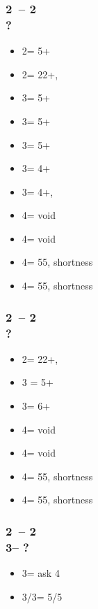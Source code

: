 \subsubsection*{2\clubs\ -- 2\hearts\\?}
\begin{itemize}
    \item 2\spades = 5+\spades
    \item 2\nt = 22+, \bal
    \item 3\clubs = 5+\clubs
    \item 3\diams = 5+\diams
    \item 3\hearts = 5+\hearts
    \item 3\spades = 4+\diams
    \item 3\nt = 4+\diams, \fonce
    \item 4\clubs = \hearts void
    \item 4\diams = \spades void
    \item 4\hearts = 55\minor, \hearts shortness
    \item 4\spades = 55\minor, \spades shortness
\end{itemize}

\subsubsection*{2\clubs\ -- 2\spades\\?}
\begin{itemize}
    \item 2\nt = 22+, \bal
    \item 3 = 5+
    \item 3\nt = 6+\major
    \item 4\clubs = \hearts void
    \item 4\diams = \spades void
    \item 4\hearts = 55\minor, \hearts shortness
    \item 4\spades = 55\minor, \spades shortness
\end{itemize}

\subsubsection*{2\clubs\ -- 2\\
                3\clubs -- ?}
\begin{itemize}
    \item 3\diams = ask 4\major
    \item 3\hearts/3\spades = 5\hearts/5\spades
\end{itemize}

